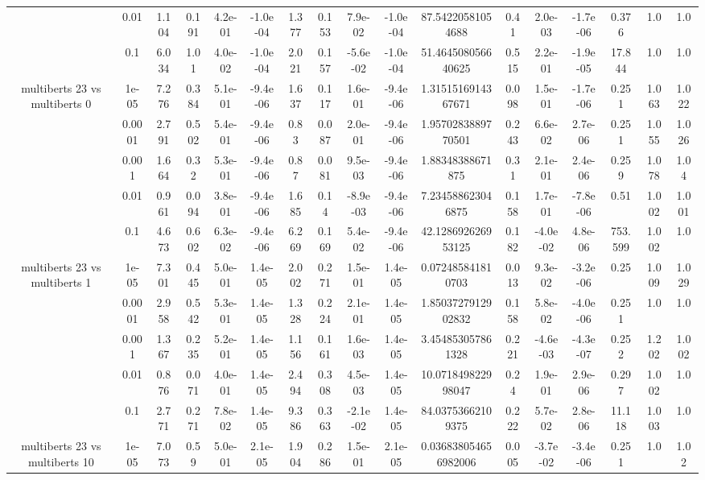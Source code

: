 \begin{tabular}{|c|c|c|c|c|c|c|c|c|c|c|c|c|c|c|c|c|}
 & 0.01 & 1.104 & 0.191 & 4.2e-01 & -1.0e-04 & 1.377 & 0.153 & 7.9e-02 & -1.0e-04 & 87.54220581054688 & 0.41 & 2.0e-03 & -1.7e-06 & 0.376 & 1.0 & 1.0 \\
 & 0.1 & 6.034 & 1.01 & 4.0e-02 & -1.0e-04 & 2.021 & 0.157 & -5.6e-02 & -1.0e-04 & 51.464508056640625 & 0.515 & 2.2e-01 & -1.9e-05 & 17.844 & 1.0 & 1.0 \\
\hline
\multirow{5}{*}{multiberts 23 vs multiberts 0} & 1e-05 & 7.276 & 0.384 & 5.1e-01 & -9.4e-06 & 1.637 & 0.117 & 1.6e-01 & -9.4e-06 & 1.3151516914367671 & 0.098 & 1.5e-01 & -1.7e-06 & 0.251 & 1.063 & 1.022 \\
 & 0.0001 & 2.791 & 0.502 & 5.4e-01 & -9.4e-06 & 0.83 & 0.087 & 2.0e-01 & -9.4e-06 & 1.9570283889770501 & 0.243 & 6.6e-02 & 2.7e-06 & 0.251 & 1.055 & 1.026 \\
 & 0.001 & 1.664 & 0.32 & 5.3e-01 & -9.4e-06 & 0.87 & 0.081 & 9.5e-03 & -9.4e-06 & 1.88348388671875 & 0.31 & 2.1e-01 & 2.4e-06 & 0.259 & 1.078 & 1.04 \\
 & 0.01 & 0.961 & 0.094 & 3.8e-01 & -9.4e-06 & 1.685 & 0.14 & -8.9e-03 & -9.4e-06 & 7.234588623046875 & 0.158 & 1.7e-01 & -7.8e-06 & 0.51 & 1.002 & 1.001 \\
 & 0.1 & 4.673 & 0.602 & 6.3e-02 & -9.4e-06 & 6.269 & 0.169 & 5.4e-02 & -9.4e-06 & 42.128692626953125 & 0.182 & -4.0e-02 & 4.8e-06 & 753.599 & 1.002 & 1.0 \\
\hline
\multirow{5}{*}{multiberts 23 vs multiberts 1} & 1e-05 & 7.301 & 0.445 & 5.0e-01 & 1.4e-05 & 2.002 & 0.271 & 1.5e-01 & 1.4e-05 & 0.072485841810703 & 0.013 & 9.3e-02 & -3.2e-06 & 0.25 & 1.009 & 1.029 \\
 & 0.0001 & 2.958 & 0.542 & 5.3e-01 & 1.4e-05 & 1.328 & 0.224 & 2.1e-01 & 1.4e-05 & 1.8503727912902832 & 0.158 & 5.8e-02 & -4.0e-06 & 0.251 & 1.0 & 1.0 \\
 & 0.001 & 1.367 & 0.235 & 5.2e-01 & 1.4e-05 & 1.156 & 0.161 & 1.6e-03 & 1.4e-05 & 3.454853057861328 & 0.221 & -4.6e-03 & -4.3e-07 & 0.252 & 1.202 & 1.002 \\
 & 0.01 & 0.876 & 0.071 & 4.0e-01 & 1.4e-05 & 2.494 & 0.308 & 4.5e-03 & 1.4e-05 & 10.071849822998047 & 0.24 & 1.9e-01 & 2.9e-06 & 0.297 & 1.002 & 1.0 \\
 & 0.1 & 2.771 & 0.271 & 7.8e-02 & 1.4e-05 & 9.386 & 0.363 & -2.1e-02 & 1.4e-05 & 84.03753662109375 & 0.222 & 5.7e-02 & 2.8e-06 & 11.118 & 1.003 & 1.0 \\
\hline
\multirow{5}{*}{multiberts 23 vs multiberts 10} & 1e-05 & 7.073 & 0.59 & 5.0e-01 & 2.1e-05 & 1.904 & 0.286 & 1.5e-01 & 2.1e-05 & 0.036838054656982006 & 0.005 & -3.7e-02 & -3.4e-06 & 0.251 & 1.0 & 1.02 \\

\end{tabular}
